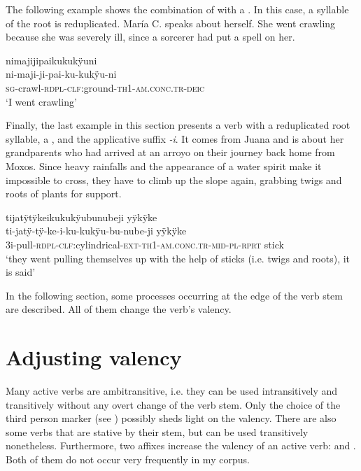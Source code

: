 The following example shows the combination of  with a . In this case, a syllable of the root is reduplicated. María C. speaks about herself. She went crawling because she was severely ill, since a sorcerer had put a spell on her.

\ea\label{ex:act-combi-1}
\begingl
\glpreamble nimajijipaikukukÿuni\\
\gla ni-maji-ji-pai-ku-kukÿu-ni\\
\textsc{sg}-crawl-\textsc{rdpl}-\textsc{clf:}ground-\textsc{th}1-\textsc{am.conc.tr}-\textsc{deic}\\
\glft ‘I went crawling’
\endgl
\trailingcitation{[ump-p110815sf.306]}
\xe

Finally, the last example in this section presents a verb with a reduplicated root syllable, a , and the applicative suffix \textit{-i}. It comes from Juana and is about her grandparents who had arrived at an arroyo on their journey back home from Moxos. Since heavy rainfalls and the appearance of a water spirit make it impossible to cross, they have to climb up the slope again, grabbing twigs and roots of plants for support.

\ea\label{ex:act-combi-2}
\begingl 
\glpreamble tijatÿtÿkeikukukÿubunubeji yÿkÿke\\
\gla ti-jatÿ-tÿ-ke-i-ku-kukÿu-bu-nube-ji yÿkÿke \\ 
\glb 3i-pull-\textsc{rdpl}-\textsc{clf}:cylindrical-\textsc{ext}-\textsc{th}1-\textsc{am.conc.tr}-\textsc{mid}-\textsc{pl}-\textsc{rprt} stick\\ 
\glft ‘they went pulling themselves up with the help of sticks (i.e. twigs and roots), it is said’\\ 
\endgl
\trailingcitation{[jxx-p151016l-2]}
\xe{}

In the following section, some processes occurring at the edge of the verb stem are described. All of them change the verb’s valency.


\section{Adjusting valency}\label{sec:Valency}

Many active verbs are ambitransitive, i.e. they can be used intransitively and transitively without any overt change of the verb stem. Only the choice of the third person marker (see ) possibly sheds light on the valency. There are also some verbs that are stative by their stem, but can be used transitively nonetheless. Furthermore, two affixes increase the valency of an active verb:  and . Both of them do not occur very frequently in my corpus.

